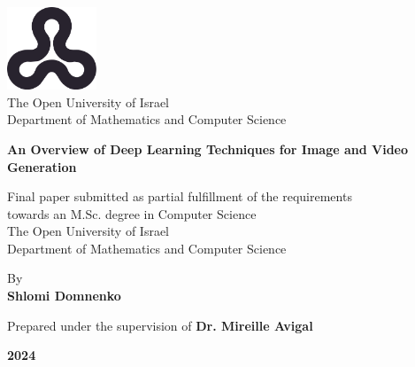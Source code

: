 \begin{titlepage}
    \begin{center}
        \vspace*{1cm}
        
        \includegraphics[width=0.2\textwidth]{images/ou_logo.png}\\
        The Open University of Israel\\
        Department of Mathematics and Computer Science
        
        \vspace{2cm}
        
        {\Large \textbf{An Overview of Deep Learning Techniques for Image and Video Generation}}
        \vspace{1.5cm}
        
        Final paper submitted as partial fulfillment of the requirements\\towards an M.Sc. degree in Computer Science\\
        The Open University of Israel\\
        Department of Mathematics and Computer Science
        
        \vspace{1cm}
        
        By \\
        \textbf{Shlomi Domnenko}
        
        \vspace{1cm}
        
        Prepared under the supervision of \textbf{Dr. Mireille Avigal}
        
        \vfill
        
        \textbf{{\monthname} 2024}
    \end{center}
\end{titlepage}